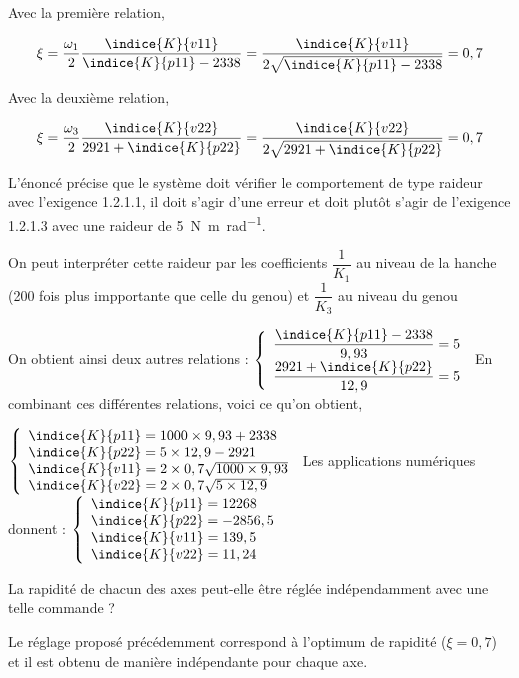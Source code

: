 \begin{corrige}
Avec la première relation,

\begin{align*}
\xi=\dfrac{\omega_1}{2}\dfrac{\indice{K}{v11}}{\indice{K}{p11}-2338}=\dfrac{\indice{K}{v11}}{2\sqrt{\indice{K}{p11}-2338}}=0,7
\end{align*}

Avec la deuxième relation,

\begin{align*}
\xi=\dfrac{\omega_3}{2}\dfrac{\indice{K}{v22}}{2921+\indice{K}{p22}}=\dfrac{\indice{K}{v22}}{2\sqrt{2921+\indice{K}{p22}}}=0,7
\end{align*}

L'énoncé précise que le système doit vérifier le comportement de type raideur avec l'exigence 1.2.1.1, il doit s'agir d'une erreur et doit plutôt s'agir de l'exigence 1.2.1.3 avec une raideur de \SI{5}{N.m.rad^{-1}}.

On peut interpréter cette raideur par les coefficients $\dfrac{1}{K_1}$ au niveau de la hanche (200 fois plus impportante que celle du genou) et $\dfrac{1}{K_3}$ au niveau du genou

On obtient ainsi deux autres relations :  
$\left\{
\begin{array}{l}
\dfrac{\indice{K}{p11}-2338}{9,93}=5\time 200\\
\dfrac{2921+\indice{K}{p22}}{12,9}=5
\end{array}
\right.
$
En combinant ces différentes relations, voici ce qu'on obtient,

$
\left\{
\begin{array}{l}
\indice{K}{p11}=1000\times 9,93+2338\\
\indice{K}{p22}=5\times 12,9-2921\\
\indice{K}{v11}=2\times 0,7\sqrt{1000\times 9,93}\\
\indice{K}{v22}=2\times 0,7\sqrt{5\times 12,9}
\end{array}
\right.
$
Les applications numériques donnent : 
$
\left\{
\begin{array}{l}
\indice{K}{p11}=12268 \\
\indice{K}{p22}=-2856,5 \\
\indice{K}{v11}=139,5\\
\indice{K}{v22}=11,24
\end{array}
\right.
$

\end{corrige}
\else
\fi

\begin{question}
\label{2023_ccs_psi_q_29}
La rapidité de chacun des axes peut-elle être réglée indépendamment avec une telle commande ?
\end{question}
\ifprof
\begin{corrige}
Le réglage proposé précédemment correspond à l'optimum de rapidité ($\xi=0,7$) et il est obtenu de manière indépendante pour chaque axe.
\end{corrige}
\else
\fi

